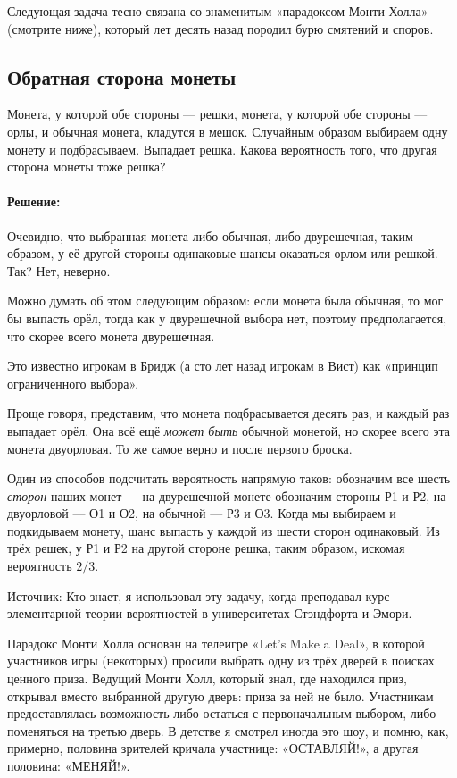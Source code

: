 \medskip

Следующая задача тесно связана со знаменитым «парадоксом Монти Холла» (смотрите ниже), который лет десять назад породил бурю смятений и споров.

\subsection*{Обратная сторона монеты}%

Монета, у которой обе стороны --- решки, монета, у которой обе стороны --- орлы, и обычная монета, кладутся в мешок.
Случайным образом выбираем одну монету и подбрасываем.
Выпадает решка.
Какова вероятность того, что другая сторона монеты тоже решка?

\paragraph{Решение:}
Очевидно, что выбранная монета либо обычная, либо двурешечная, таким образом, у её другой стороны одинаковые шансы оказаться орлом или решкой.
Так?
Нет, неверно.

Можно думать об этом следующим образом: если монета была обычная, то мог бы выпасть орёл, тогда как у двурешечной выбора нет, поэтому предполагается, что скорее всего монета двурешечная.

Это известно игрокам в Бридж (а сто лет назад игрокам в Вист) как «принцип ограниченного выбора».

Проще говоря, представим, что монета подбрасывается десять раз, и каждый раз выпадает орёл.
Она всё ещё \emph{может быть} обычной монетой, но скорее всего эта монета двуорловая.
То же самое верно и после первого броска.

Один из способов подсчитать вероятность напрямую таков:
обозначим все шесть \emph{сторон} наших монет ---
на двурешечной монете обозначим стороны Р1 и Р2, на двуорловой --- О1 и О2, на обычной --- Р3 и О3.
Когда мы выбираем и подкидываем монету, шанс выпасть у каждой из шести сторон одинаковый.
Из трёх решек, у Р1 и Р2 на другой стороне решка, таким образом, искомая вероятность $2/3$.\heart

Источник: Кто знает, я использовал эту задачу, когда преподавал курс элементарной теории вероятностей в университетах Стэндфорта и Эмори.

\medskip

Парадокс Монти Холла основан на телеигре «Let’s Make a Deal», в которой участников игры (некоторых) просили выбрать одну из трёх дверей в поисках ценного приза.
Ведущий Монти Холл, который знал, где находился приз, открывал вместо выбранной другую дверь: приза за ней не было.
Участникам предоставлялась возможность либо остаться с первоначальным выбором, либо поменяться на третью дверь.
В детстве я смотрел иногда это шоу, и помню, как, примерно, половина зрителей кричала участнице: «ОСТАВЛЯЙ!», а другая половина: «МЕНЯЙ!».

